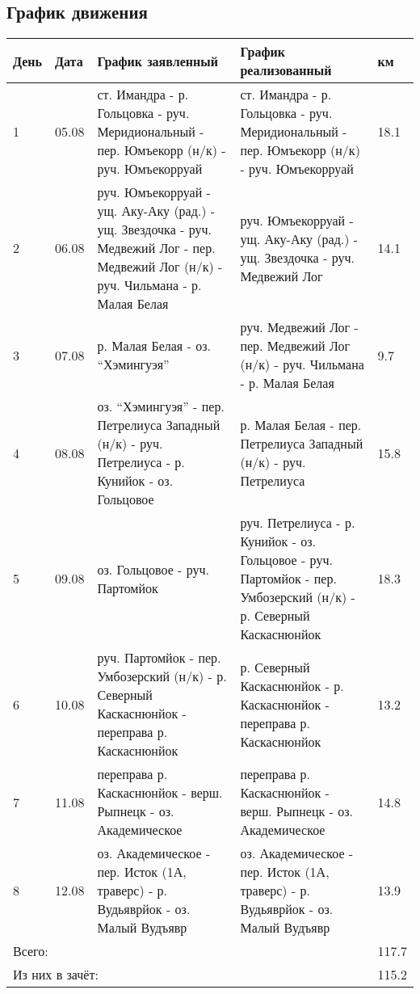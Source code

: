 \subsection{График движения}
\begin{longtable}{|l|l|p{6cm}|p{6cm}|l|}
    \hline
    День & Дата & График заявленный & График реализованный & км\\
    \hline
    1 &
    05.08 &
    ст. Имандра - р. Гольцовка - руч. Меридиональный - пер. Юмъекорр (н/к) - руч. Юмъекорруай &
    ст. Имандра - р. Гольцовка - руч. Меридиональный - пер. Юмъекорр (н/к) - руч. Юмъекорруай &
    18.1
    \\
    \hline
    2 &
    06.08 &
    руч. Юмъекорруай - ущ. Аку-Аку (рад.) - ущ. Звездочка - руч. Медвежий Лог - пер. Медвежий Лог (н/к)
    - руч. Чильмана - р. Малая Белая &
    руч. Юмъекорруай - ущ. Аку-Аку (рад.) - ущ. Звездочка - руч. Медвежий Лог &
    14.1
    \\
    \hline
    3 &
    07.08 &
    р. Малая Белая - оз. ``Хэмингуэя'' &
    руч. Медвежий Лог - пер. Медвежий Лог (н/к) - руч. Чильмана - р. Малая Белая &
    9.7
    \\
    \hline
    4 &
    08.08 &
    оз. “Хэмингуэя” - пер. Петрелиуса Западный (н/к) - руч. Петрелиуса - р. Кунийок - оз. Гольцовое &
    р. Малая Белая - пер. Петрелиуса Западный (н/к) - руч. Петрелиуса &
    15.8
    \\
    \hline
    5 &
    09.08 &
    оз. Гольцовое - руч. Партомйок &
    руч. Петрелиуса - р. Кунийок - оз. Гольцовое  - руч. Партомйок - пер. Умбозерский (н/к) - р. Северный Каскаснюнйок &
	18.3
    \\
    \hline
    6 &
    10.08 &
    руч. Партомйок - пер. Умбозерский (н/к) - р. Северный Каскаснюнйок - переправа р. Каскаснюнйок &
    р. Северный Каскаснюнйок - р. Каскаснюнйок - переправа р. Каскаснюнйок &
	13.2
    \\
    \hline
    7 &
    11.08 &
    переправа р. Каскаснюнйок - верш. Рыпнецк - оз. Академическое &
    переправа р. Каскаснюнйок - верш. Рыпнецк - оз. Академическое &
	14.8
    \\
    \hline
    8 &
    12.08 &
    оз. Академическое - пер. Исток (1А, траверс) - р. Вудьяврйок - оз. Малый Вудъявр &
    оз. Академическое - пер. Исток (1А, траверс) - р. Вудьяврйок - оз. Малый Вудъявр &
	13.9
    \\
    \hline
    \multicolumn{4}{|l|}{Всего:} &
	117.7
    \\
    \multicolumn{4}{|l|}{Из них в зачёт:} &
    115.2
    \\
    \hline
\end{longtable}

